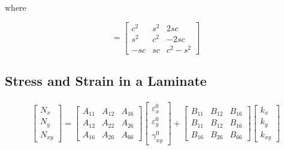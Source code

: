 \documentclass[smallextended]{svjour3}       %
\begin{document}
where 

\begin{equation}
	[T]=\left[\begin{array}{ccc}c^{2} & s^{2} & 2 s c \\ s^{2} & c^{2} & -2 s c \\ -s c & s c &
	c^{2}-s^{2}\end{array}\right]
\end{equation}

\subsection{Stress and Strain in a Laminate}


\begin{equation} \label{eq:force_and_moments}
	\begin{array}{l}

	\begin{bmatrix}
		N_x \\
		N_y \\
		N_{xy}
	\end{bmatrix}
	=
	\begin{bmatrix}
		A_{11} & A_{12} & A_{16} \\
		A_{12} & A_{22} & A_{26} \\
		A_{16} & A_{26} & A_{66} 
	\end{bmatrix}
    \begin{bmatrix}
		\varepsilon_x^0 \\
        \varepsilon_y^0 \\
		\gamma_{xy}^0
    \end{bmatrix} 
	+
	\begin{bmatrix}
		B_{11} & B_{12} & B_{16} \\
		B_{11} & B_{12} & B_{16} \\
		B_{16} & B_{26} & B_{66} 
	\end{bmatrix}
	\begin{bmatrix}
		k_x \\
		k_y \\
		k_{xy} 
	\end{bmatrix}  \\
	\\


\end{array}
\end{equation}
\end{document}
